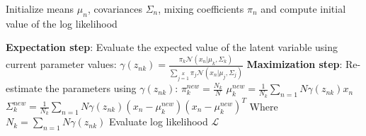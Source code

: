 \begin{algorithmic}
\State Initialize means $\mu_n$, covariances $\Sigma_n$, mixing coefficients $\pi_n$ and compute initial value of the log likelihood

\Repeat
	\State \textbf{Expectation step}: Evaluate the expected value of the latent variable using current parameter values:
		\State $\gamma(z_{nk}) = 
		\frac{\pi_k\mathcal{N}(x_n|\mu_k, \Sigma_k)}{\sum\limits_{j=1}\limits^{K}\pi_j\mathcal{N}(x_n|\mu_j, \Sigma_j)}$
	\State \textbf{Maximization step}: Re-estimate the parameters using $\gamma(z_{nk})$:
		\State $\pi^{new}_k = \frac{N_k}{N}$
		\State $\mu^{new}_k = \frac{1}{N_k}\sum\limits_{n=1}\limits{N}\gamma(z_{nk})x_n$
		\State $\Sigma^{new}_k = \frac{1}{N_k}\sum\limits_{n=1}\limits{N}\gamma(z_{nk}) (x_n - \mu^{new}_k) (x_n - \mu^{new}_k)^T$
		\State Where $N_k = \sum\limits_{n=1}\limits{N}\gamma(z_{nk})$
	\State Evaluate log likelihood $\mathcal{L}$ 
\end{algorithmic}

\pagebreak
